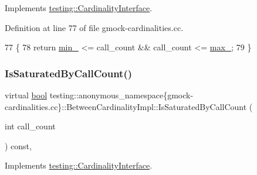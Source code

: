 Implements \hyperlink{classtesting_1_1CardinalityInterface_af89684f4ea6d9de331abf7958754d8f1}{testing\+::\+Cardinality\+Interface}.



Definition at line 77 of file gmock-\/cardinalities.\+cc.


\begin{DoxyCode}
77                                                             \{
78     \textcolor{keywordflow}{return} \hyperlink{classtesting_1_1anonymous__namespace_02gmock-cardinalities_8cc_03_1_1BetweenCardinalityImpl_aaa6c70686dc7e205bd949c11b21648e8}{min\_} <= call\_count && call\_count <= \hyperlink{classtesting_1_1anonymous__namespace_02gmock-cardinalities_8cc_03_1_1BetweenCardinalityImpl_acf6f35b47bf9f52b714ccceb22255aeb}{max\_};
79   \}
\end{DoxyCode}
\mbox{\label{classtesting_1_1anonymous__namespace_02gmock-cardinalities_8cc_03_1_1BetweenCardinalityImpl_add59b47271e1dc87cf2cde64ecf9ff9e}} 
\subsubsection{\texorpdfstring{Is\+Saturated\+By\+Call\+Count()}{IsSaturatedByCallCount()}}
{\footnotesize\ttfamily virtual \hyperlink{classbool}{bool} testing\+::anonymous\+\_\+namespace\{gmock-\/cardinalities.\+cc\}\+::Between\+Cardinality\+Impl\+::\+Is\+Saturated\+By\+Call\+Count (\begin{DoxyParamCaption}\item[{int}]{call\+\_\+count }\end{DoxyParamCaption}) const\hspace{0.3cm}{\ttfamily [inline]}, {\ttfamily [virtual]}}



Implements \hyperlink{classtesting_1_1CardinalityInterface_a42508cff9627de2e6f9c1ec33a7d8bf2}{testing\+::\+Cardinality\+Interface}.



